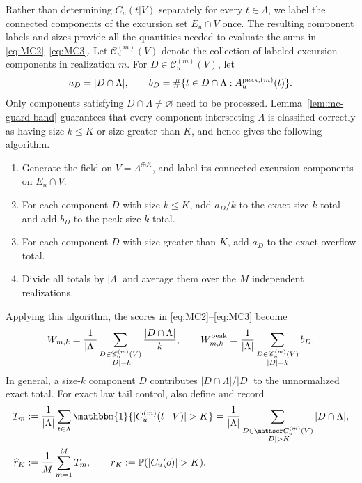 \documentclass[aap,preprint]{imsart}
\theoremstyle{plain}
\theoremstyle{definition}
\def\P{{\mathbb P}}
\begin{document}
Rather than determining $C_u(t| V)$ separately for every
$t\in\Lambda$, we label the connected components of the excursion set
$E_u\cap V$ once. The resulting component labels and sizes provide all the quantities needed to evaluate the sums in \eqref{eq:MC2}--\eqref{eq:MC3}. Let
$\mathscr C_u^{(m)}(V)$ denote the collection of labeled excursion components in
realization $m$.  For $D\in\mathscr C_u^{(m)}(V)$, let
\[
a_D=|D\cap\Lambda|,
\qquad
b_D=\#\{t\in D\cap\Lambda:
A_u^{{\rm peak},(m)}(t)\}.
\]
Only components satisfying $D\cap\Lambda\neq\varnothing$ need to be processed. Lemma~\ref{lem:mc-guard-band} guarantees that every component intersecting
$\Lambda$ is classified correctly as having size $k\leq K$ or size greater
than $K$, and hence gives the following algorithm.
\begin{enumerate}[label=(\roman*)]
	\item Generate the field on $V=\Lambda^{\oplus K}$, and label its connected excursion components on $E_u\cap V$.
	\item For each component $D$ with size $k\leq K$, add $a_D/k$ to the exact size-$k$ total and add $b_D$ to the peak size-$k$ total.
	\item For each component $D$ with size greater than $K$, add $a_D$ to the exact overflow total.
	\item Divide all totals by $|\Lambda|$ and average them over the $M$
	independent realizations.
\end{enumerate}
Applying this algorithm, the scores in \eqref{eq:MC2}--\eqref{eq:MC3} become
\begin{align}\label{eq:W2}
	W_{m,k}
	=
	\frac1{|\Lambda|}
	\sum_{\substack{D\in\mathscr C_u^{(m)}(V)\\
			|D|=k}}
	\frac{|D\cap\Lambda|}{k}, \qquad 
	W_{m,k}^{\rm peak}
	=
	\frac1{|\Lambda|}
	\sum_{\substack{D\in\mathscr C_u^{(m)}(V)\\
			|D|=k}}
	b_D.
\end{align}
In general, a size-$k$ component $D$ contributes $|D\cap\Lambda|/|D|$ to the unnormalized exact total. For exact law tail control, also define and record
\begin{equation}\label{eq:mc-overflow-estimators}
	\begin{split}
	T_m&:=\frac1{|\Lambda|}\sum_{t\in\Lambda}
	\mathbbm{1}\{|C_u^{(m)}(t\mid V)|>K\} = \frac1{|\Lambda|}
	\sum_{\substack{D\in\mathscr C_u^{(m)}(V)\\|D|>K}}
	|D\cap\Lambda|,\\
	\widehat r_K&:=\frac1M\sum_{m=1}^M T_m, \qquad r_K:=\P(|C_u(o)|>K).
\end{split}
\end{equation}
\end{document}
